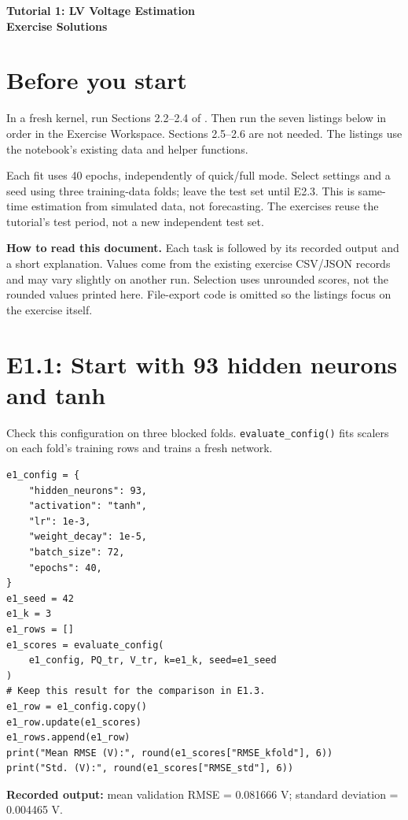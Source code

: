 \documentclass[11pt,a4paper]{article}
\begin{document}
\begin{center}
{\Large\bfseries Tutorial 1: LV Voltage Estimation\\Exercise Solutions}
\end{center}

\section*{Before you start}
In a fresh kernel, run Sections 2.2--2.4 of
. Then run the seven listings
below in order in the Exercise Workspace. Sections 2.5--2.6 are not needed.
The listings use the notebook's existing data and helper functions.

Each fit uses 40 epochs, independently of quick/full mode. Select settings
and a seed using three training-data folds; leave the test set until E2.3.
This is same-time estimation from simulated data, not forecasting. The
exercises reuse the tutorial's test period, not a new independent test set.

\textbf{How to read this document.} Each task is followed by its recorded
output and a short explanation. Values come from the existing exercise
CSV/JSON records and may vary slightly on another run. Selection uses
unrounded scores, not the rounded values printed here. File-export code
is omitted so the listings focus on the exercise itself.

\section*{E1.1: Start with 93 hidden neurons and tanh}
Check this configuration on three blocked folds. \texttt{evaluate\_config()}
fits scalers on each fold's training rows and trains a fresh network.

\begin{lstlisting}
e1_config = {
    "hidden_neurons": 93,
    "activation": "tanh",
    "lr": 1e-3,
    "weight_decay": 1e-5,
    "batch_size": 72,
    "epochs": 40,
}
e1_seed = 42
e1_k = 3
e1_rows = []
e1_scores = evaluate_config(
    e1_config, PQ_tr, V_tr, k=e1_k, seed=e1_seed
)
# Keep this result for the comparison in E1.3.
e1_row = e1_config.copy()
e1_row.update(e1_scores)
e1_rows.append(e1_row)
print("Mean RMSE (V):", round(e1_scores["RMSE_kfold"], 6))
print("Std. (V):", round(e1_scores["RMSE_std"], 6))
\end{lstlisting}

\textbf{Recorded output:} mean validation RMSE = 0.081666 V;
standard deviation = 0.004465 V.
\end{document}
